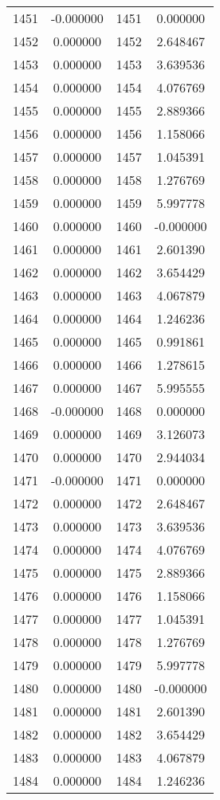 \documentclass[12pt]{article}
\begin{document}
\begin{longtable}{@{}cccc@{}}
1451 & -0.000000 & 1451 & 0.000000 \\
1452 & 0.000000 & 1452 & 2.648467 \\
1453 & 0.000000 & 1453 & 3.639536 \\
1454 & 0.000000 & 1454 & 4.076769 \\
1455 & 0.000000 & 1455 & 2.889366 \\
1456 & 0.000000 & 1456 & 1.158066 \\
1457 & 0.000000 & 1457 & 1.045391 \\
1458 & 0.000000 & 1458 & 1.276769 \\
1459 & 0.000000 & 1459 & 5.997778 \\
1460 & 0.000000 & 1460 & -0.000000 \\
1461 & 0.000000 & 1461 & 2.601390 \\
1462 & 0.000000 & 1462 & 3.654429 \\
1463 & 0.000000 & 1463 & 4.067879 \\
1464 & 0.000000 & 1464 & 1.246236 \\
1465 & 0.000000 & 1465 & 0.991861 \\
1466 & 0.000000 & 1466 & 1.278615 \\
1467 & 0.000000 & 1467 & 5.995555 \\
1468 & -0.000000 & 1468 & 0.000000 \\
1469 & 0.000000 & 1469 & 3.126073 \\
1470 & 0.000000 & 1470 & 2.944034 \\
1471 & -0.000000 & 1471 & 0.000000 \\
1472 & 0.000000 & 1472 & 2.648467 \\
1473 & 0.000000 & 1473 & 3.639536 \\
1474 & 0.000000 & 1474 & 4.076769 \\
1475 & 0.000000 & 1475 & 2.889366 \\
1476 & 0.000000 & 1476 & 1.158066 \\
1477 & 0.000000 & 1477 & 1.045391 \\
1478 & 0.000000 & 1478 & 1.276769 \\
1479 & 0.000000 & 1479 & 5.997778 \\
1480 & 0.000000 & 1480 & -0.000000 \\
1481 & 0.000000 & 1481 & 2.601390 \\
1482 & 0.000000 & 1482 & 3.654429 \\
1483 & 0.000000 & 1483 & 4.067879 \\
1484 & 0.000000 & 1484 & 1.246236 \\

\end{longtable}
\end{document}
